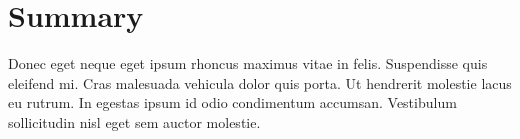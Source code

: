 \section{Summary}

{


\par Donec eget neque eget ipsum rhoncus maximus vitae in felis. Suspendisse quis eleifend mi. Cras malesuada vehicula dolor quis porta. Ut hendrerit molestie lacus eu rutrum. In egestas ipsum id odio condimentum accumsan. Vestibulum sollicitudin nisl eget sem auctor molestie.

}

